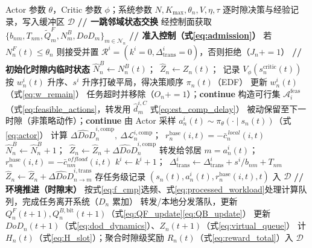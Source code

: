 \documentclass[a4paper,11pt]{article}
\begin{document}
\begin{algorithm}[t]
\caption{DA-MAPPO 在线执行（单 rollout，分布式执行）}
\label{alg:execution}
\begin{algorithmic}[1]
\REQUIRE Actor 参数 $\theta$，Critic 参数 $\phi$；系统参数 $N,K_{\max},\theta_n,V,\eta,\tau$
\ENSURE 逐时隙决策与经验记录，写入缓冲区 $\mathcal{D}$
    \STATE \textbf{// 一跳邻域状态交换}
    \STATE 经控制面获取 $\{b_{nm},T_{nm},\tilde{Q}^F_m,N^B_m,DoD_m\}_{m\in\mathcal{N}_n}$
    \STATE \textbf{// 准入控制（式\eqref{eq:admission}）}
      \STATE 若 $N^F_n(t)\le\theta_n$ 则接受并置 $\mathcal{R}^i=(k^i{=}0,\Delta^i_{\mathrm{trans}}{=}0)$，否则拒绝（$J_n{+}{=}1$）
    \ENDFOR
    \STATE \textbf{// 初始化时隙内临时状态}
    \STATE $\hat{N}^B_n \leftarrow N^B_n(t)$；\ $\hat{Z}_n \leftarrow Z_n(t)$；\ 记录 $V_\phi(s^{\mathrm{critic}}_n(t))$
    \STATE 按 $w^i_n(t)$ 升序、$s^i$ 升序打破平局，得决策顺序 $\pi_n(t)$（EDF）
      \STATE 更新 $w^i_n(t)$（式\eqref{eq:w_remain}）
        \STATE 任务超时并移除（$O_n{+}{=}1$）；\textbf{continue}
      \ENDIF
      \STATE 构造可行集 $\mathcal{A}^{\mathrm{feas}}_i$（式\eqref{eq:feasible_actions}，转发用 $\hat{d}^{i,C}_m$ 式\eqref{eq:est_comp_delay}）
        \STATE 被动保留至下一时隙（非策略动作）；\textbf{continue}
      \ENDIF
      \STATE 由 Actor 采样 $a^i_n(t)\sim\pi_\theta(\cdot\mid s_n(t))$（式\eqref{eq:actor}）
        \STATE 计算 $\widehat{\Delta DoD}^{i,\mathrm{comp}}_n,\ \Delta\mathcal{L}^{i,\mathrm{comp}}_n$；\ $r^{\mathrm{base}}_n(i,t)=-\bar{c}^{\,local}_n(i,t)$
        \STATE $\hat{N}^B_n \leftarrow \hat{N}^B_n+1$；\ $\hat{Z}_n \leftarrow \hat{Z}_n+\widehat{\Delta DoD}^{i,\mathrm{comp}}_n$
      \ELSE
        \STATE 转发给邻居 $m=a^i_n(t)$；\ $r^{\mathrm{base}}_n(i,t)=-\bar{c}^{\,offload}_{nm}(i,t)$
        \STATE $k^i \leftarrow k^i+1$；\ $\Delta^i_{\mathrm{trans}} \leftarrow \Delta^i_{\mathrm{trans}}+s^i/b_{nm}+T_{nm}$
        \STATE $\hat{Z}_n \leftarrow \hat{Z}_n+\widehat{\Delta DoD}^{i,\mathrm{trans}}_{n\to m}$
      \ENDIF
      \STATE 存任务级记录 $(s_n(t),a^i_n(t),r^{\mathrm{base}}_n(i,t),t)$ 入 $\mathcal{D}$
    \ENDFOR
  \ENDFOR
  \STATE \textbf{// 环境推进（时隙末）}
    \STATE 按式\eqref{eq:f_cmp}选频、式\eqref{eq:processed_workload}处理计算队列，完成任务离开系统（$D_n$ 累加）
    \STATE 转发/本地分发落队，更新 $Q^F_n(t\!+\!1),Q^{B,\mathrm{bit}}_n(t\!+\!1)$（式\eqref{eq:QF_update}\eqref{eq:QB_update}）
    \STATE 更新 $DoD_n(t\!+\!1)$（式\eqref{eq:dod_dynamics}）、$Z_n(t\!+\!1)$（式\eqref{eq:virtual_queue}）
    \STATE 计 $H_n(t)$（式\eqref{eq:H_slot}）；聚合时隙级奖励 $R_n(t)$（式\eqref{eq:reward_total}）入 $\mathcal{D}$
  \ENDFOR
\ENDFOR
\end{algorithmic}
\end{algorithm}
\end{document}
